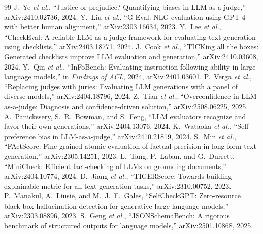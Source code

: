 \documentclass[10pt,journal]{IEEEtran}
\begin{document}
\begin{thebibliography}{99}
 J.~Ye \emph{et al.}, ``Justice or prejudice? Quantifying biases in LLM-as-a-judge,'' arXiv:2410.02736, 2024.
 Y.~Liu \emph{et al.}, ``G-Eval: NLG evaluation using GPT-4 with better human alignment,'' arXiv:2303.16634, 2023.
 Y.~Lee \emph{et al.}, ``CheckEval: A reliable LLM-as-a-judge framework for evaluating text generation using checklists,'' arXiv:2403.18771, 2024.
 J.~Cook \emph{et al.}, ``TICKing all the boxes: Generated checklists improve LLM evaluation and generation,'' arXiv:2410.03608, 2024.
 Y.~Qin \emph{et al.}, ``InFoBench: Evaluating instruction following ability in large language models,'' in \emph{Findings of ACL}, 2024, arXiv:2401.03601.
 P.~Verga \emph{et al.}, ``Replacing judges with juries: Evaluating LLM generations with a panel of diverse models,'' arXiv:2404.18796, 2024.
 Z.~Tian \emph{et al.}, ``Overconfidence in LLM-as-a-judge: Diagnosis and confidence-driven solution,'' arXiv:2508.06225, 2025.
 A.~Panickssery, S.~R.~Bowman, and S.~Feng, ``LLM evaluators recognize and favor their own generations,'' arXiv:2404.13076, 2024.
 K.~Wataoka \emph{et al.}, ``Self-preference bias in LLM-as-a-judge,'' arXiv:2410.21819, 2024.
 S.~Min \emph{et al.}, ``FActScore: Fine-grained atomic evaluation of factual precision in long form text generation,'' arXiv:2305.14251, 2023.
 L.~Tang, P.~Laban, and G.~Durrett, ``MiniCheck: Efficient fact-checking of LLMs on grounding documents,'' arXiv:2404.10774, 2024.
 D.~Jiang \emph{et al.}, ``TIGERScore: Towards building explainable metric for all text generation tasks,'' arXiv:2310.00752, 2023.
 P.~Manakul, A.~Liusie, and M.~J.~F.~Gales, ``SelfCheckGPT: Zero-resource black-box hallucination detection for generative large language models,'' arXiv:2303.08896, 2023.
 S.~Geng \emph{et al.}, ``JSONSchemaBench: A rigorous benchmark of structured outputs for language models,'' arXiv:2501.10868, 2025.
\end{thebibliography}
\end{document}
